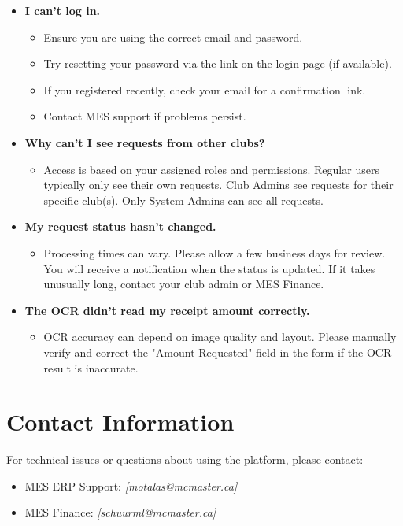\documentclass{article}
\begin{document}
\begin{itemize}
    \item \textbf{I can't log in.}
        \begin{itemize}
            \item Ensure you are using the correct email and password.
            \item Try resetting your password via the link on the login page (if available).
            \item If you registered recently, check your email for a confirmation link.
            \item Contact MES support if problems persist.
        \end{itemize}
    \item \textbf{Why can't I see requests from other clubs?}
        \begin{itemize}
            \item Access is based on your assigned roles and permissions. Regular users typically only see their own requests. Club Admins see requests for their specific club(s). Only System Admins can see all requests.
        \end{itemize}
    \item \textbf{My request status hasn't changed.}
        \begin{itemize}
            \item Processing times can vary. Please allow a few business days for review. You will receive a notification when the status is updated. If it takes unusually long, contact your club admin or MES Finance.
        \end{itemize}
    \item \textbf{The OCR didn't read my receipt amount correctly.}
        \begin{itemize}
            \item OCR accuracy can depend on image quality and layout. Please manually verify and correct the "Amount Requested" field in the form if the OCR result is inaccurate.
        \end{itemize}
\end{itemize}

\section{Contact Information}

For technical issues or questions about using the \progname{} platform, please contact:
\begin{itemize}
    \item MES ERP Support: \textit{[motalas@mcmaster.ca]}
    \item MES Finance: \textit{[schuurml@mcmaster.ca]}
\end{itemize}

\end{document}
